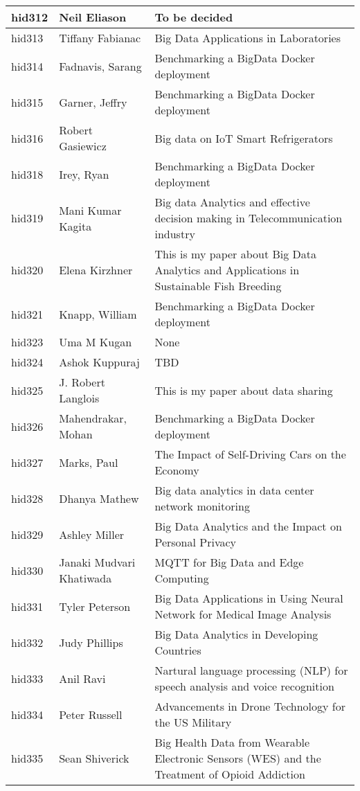 \documentclass[12pt]{book}
\begin{document}
\begin{footnotesize}
\begin{longtable}{|p{1cm}p{5cm}p{9cm}|}
\hline
hid312 & Neil Eliason & To be decided  \\
\hline
hid313 & Tiffany Fabianac & Big Data Applications in Laboratories  \\
\hline
hid314 & Fadnavis, Sarang & Benchmarking a BigData Docker deployment  \\
\hline
hid315 & Garner, Jeffry & Benchmarking a BigData Docker deployment  \\
\hline
hid316 & Robert Gasiewicz & Big data on IoT Smart Refrigerators  \\
\hline
hid318 & Irey, Ryan & Benchmarking a BigData Docker deployment  \\
\hline
hid319 & Mani Kumar Kagita & Big data Analytics and effective decision making in Telecommunication industry  \\
\hline
hid320 & Elena Kirzhner & This is my paper about Big Data Analytics and Applications in Sustainable Fish Breeding  \\
\hline
hid321 & Knapp, William & Benchmarking a BigData Docker deployment  \\
\hline
hid323 & Uma M Kugan & None  \\
\hline
hid324 & Ashok Kuppuraj & TBD  \\
\hline
hid325 & J. Robert Langlois & This is my paper about data sharing  \\
\hline
hid326 & Mahendrakar, Mohan & Benchmarking a BigData Docker deployment  \\
\hline
hid327 & Marks, Paul & The Impact of Self-Driving Cars on the Economy  \\
\hline
hid328 & Dhanya Mathew & Big data analytics in data center network monitoring  \\
\hline
hid329 & Ashley Miller & Big Data Analytics and the Impact on Personal Privacy  \\
\hline
hid330 & Janaki Mudvari Khatiwada & MQTT for Big Data and Edge Computing  \\
\hline
hid331 & Tyler Peterson & Big Data Applications in Using Neural Network for Medical Image Analysis  \\
\hline
hid332 & Judy Phillips & Big Data Analytics in Developing Countries  \\
\hline
hid333 & Anil Ravi & Nartural language processing (NLP) for speech analysis and voice recognition  \\
\hline
hid334 & Peter Russell & Advancements in Drone Technology for the US Military  \\
\hline
hid335 & Sean Shiverick & Big Health Data from Wearable Electronic Sensors (WES) and the Treatment of Opioid Addiction

\end{longtable}
\end{footnotesize}
\end{document}
